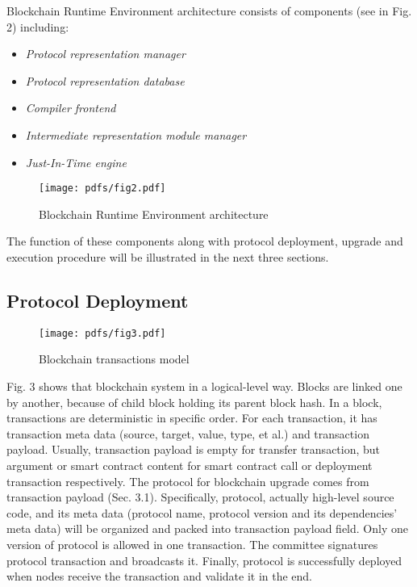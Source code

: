 \documentclass[sigplan,screen]{acmart}
\begin{document}
Blockchain Runtime Environment architecture consists of components (see in Fig.
2) including:
\begin{itemize}
  \item \textit{Protocol representation manager}
  \item \textit{Protocol representation database}
  \item \textit{Compiler frontend}
  \item \textit{Intermediate representation module manager}
  \item \textit{Just-In-Time engine}
\end{itemize}

\begin{figure}
  \texttt{[image: pdfs/fig2.pdf]}
  \caption{Blockchain Runtime Environment architecture}
\end{figure}

The function of these components along with protocol deployment, upgrade and
execution procedure will be illustrated in the next three sections.

\subsection{Protocol Deployment}

\begin{figure}
  \texttt{[image: pdfs/fig3.pdf]}
  \caption{Blockchain transactions model}
\end{figure}

Fig. 3 shows that blockchain system in a logical-level way. Blocks are linked
one by another, because of child block holding its parent block hash. In a
block, transactions are deterministic in specific order. For each transaction,
it has transaction meta data (source, target, value, type, et al.) and
transaction payload. Usually, transaction payload is empty for transfer
transaction, but argument or smart contract content for smart contract call
or deployment transaction respectively.
The protocol for blockchain upgrade comes from transaction payload
(Sec. 3.1). Specifically, protocol, actually high-level source
code, and its meta data (protocol name, protocol version and its dependencies'
meta data) will be organized and packed into transaction payload field.
Only one version of protocol is allowed in one transaction. The committee
signatures protocol transaction and broadcasts it. Finally, protocol
is successfully deployed when nodes receive the transaction and validate it in
the end.
\end{document}
